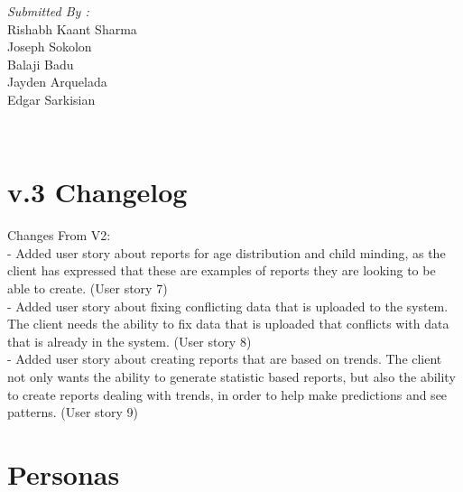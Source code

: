 \documentclass[12pt]{article}
\begin{document}
\begin{titlepage}
\begin{minipage}{0.4\textwidth}
			\begin{flushright} \large
			\emph{Submitted By :} \\
			Rishabh Kaant Sharma\\
            Joseph Sokolon\\
            Balaji Badu\\
            Jayden Arquelada\\
            Edgar Sarkisian\\
		\end{flushright}
        
	\end{minipage}\\[2 cm]
	
	
    
    
    
    
	
\end{titlepage}


\textcolor{black}{\tableofcontents}
\pagebreak

\section{v.3 Changelog}
Changes From V2:\\
- Added user story about reports for age distribution and child minding, as the client has expressed that these are examples of reports they are looking to be able to create. (User story 7)\\
- Added user story about fixing conflicting data that is uploaded to the system. The client needs the ability to fix data that is uploaded that conflicts with data that is already in the system. (User story 8)\\
- Added user story about creating reports that are based on trends. The client not only wants the ability to generate statistic based reports, but also the ability to create reports dealing with trends, in order to help make predictions and see patterns. (User story 9)\\


\section{Personas}
\end{document}

